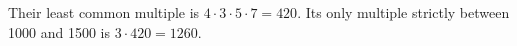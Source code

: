 Their least common multiple is $ 4\cdot3\cdot5\cdot7=420 $. Its only multiple strictly between 1000 and 1500 is $ 3\cdot420=\boxed{1260}$.
